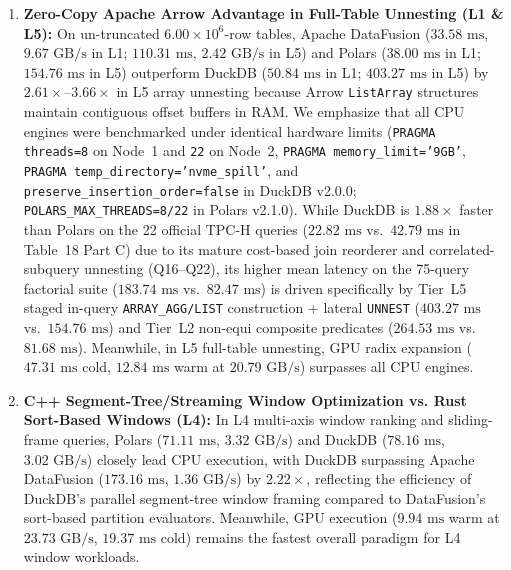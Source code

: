 \documentclass[10pt,a4paper]{article}
\begin{document}
\begin{enumerate}[leftmargin=1.5em,itemsep=2pt]
    \item \textbf{Zero-Copy Apache Arrow Advantage in Full-Table Unnesting (L1 \& L5):} On un-truncated $6.00\times 10^6$-row tables, Apache DataFusion ($33.58\text{ ms}$, $9.67\text{ GB/s}$ in L1; $110.31\text{ ms}$, $2.42\text{ GB/s}$ in L5) and Polars ($38.00\text{ ms}$ in L1; $154.76\text{ ms}$ in L5) outperform DuckDB ($50.84\text{ ms}$ in L1; $403.27\text{ ms}$ in L5) by $2.61\times\text{--}3.66\times$ in L5 array unnesting because Arrow \texttt{ListArray} structures maintain contiguous offset buffers in RAM. We emphasize that all CPU engines were benchmarked under identical hardware limits (\texttt{PRAGMA threads=8} on Node~1 and \texttt{22} on Node~2, \texttt{PRAGMA memory\_limit='9GB'}, \texttt{PRAGMA temp\_directory='nvme\_spill'}, and \texttt{preserve\_insertion\_order=false} in DuckDB v2.0.0; \texttt{POLARS\_MAX\_THREADS=8/22} in Polars v2.1.0). While DuckDB is $1.88\times$ faster than Polars on the 22 official TPC-H queries ($22.82\text{ ms}$ vs.\ $42.79\text{ ms}$ in Table~18 Part C) due to its mature cost-based join reorderer and correlated-subquery unnesting (Q16--Q22), its higher mean latency on the 75-query factorial suite ($183.74\text{ ms}$ vs.\ $82.47\text{ ms}$) is driven specifically by Tier~L5 staged in-query \texttt{ARRAY\_AGG/LIST} construction + lateral \texttt{UNNEST} ($403.27\text{ ms}$ vs.\ $154.76\text{ ms}$) and Tier~L2 non-equi composite predicates ($264.53\text{ ms}$ vs.\ $81.68\text{ ms}$). Meanwhile, in L5 full-table unnesting, GPU radix expansion ($47.31\text{ ms}$ cold, $12.84\text{ ms}$ warm at $20.79\text{ GB/s}$) surpasses all CPU engines.
    \item \textbf{C++ Segment-Tree/Streaming Window Optimization vs. Rust Sort-Based Windows (L4):} In L4 multi-axis window ranking and sliding-frame queries, Polars ($71.11\text{ ms}$, $3.32\text{ GB/s}$) and DuckDB ($78.16\text{ ms}$, $3.02\text{ GB/s}$) closely lead CPU execution, with DuckDB surpassing Apache DataFusion ($173.16\text{ ms}$, $1.36\text{ GB/s}$) by $\mathbf{2.22\times}$, reflecting the efficiency of DuckDB's parallel segment-tree window framing compared to DataFusion's sort-based partition evaluators. Meanwhile, GPU execution ($9.94\text{ ms}$ warm at $23.73\text{ GB/s}$, $19.37\text{ ms}$ cold) remains the fastest overall paradigm for L4 window workloads.
\end{enumerate}
\end{document}
